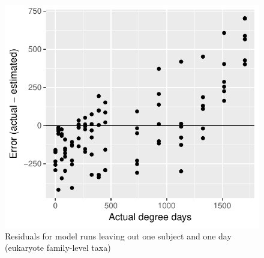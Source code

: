 \documentclass{article}
\begin{document}
\begin{figure}
  \centering
  \includegraphics{../../../eukaryote_data/only_families/all_time_steps/hit_1perc_twice/leave_out_one_subj_and_one_day_residuals}
  \caption{Residuals for model runs leaving out one subject and one day (eukaryote family-level taxa)}
  \label{fig:leave_one_out_resids_eukaryote_family_taxa}
\end{figure}
\end{document}
